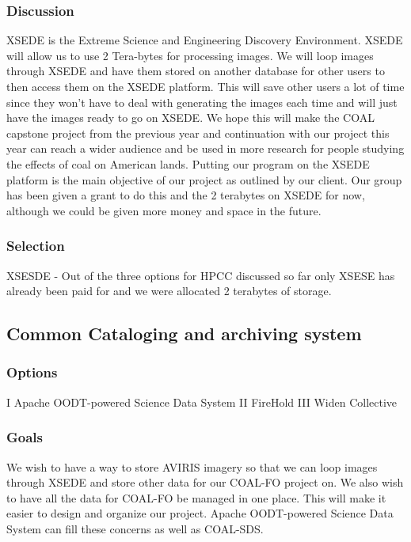 \documentclass[10pt,draftclsnofoot,onecolumn,journal,compsoc]{IEEEtran}
\begin{document}
\subsubsection{Discussion}

\noindent XSEDE is the Extreme Science and Engineering Discovery Environment. XSEDE will allow us to use 2 Tera-bytes for processing images. We will loop images through XSEDE and have them stored on another database for other users to then access them on the XSEDE platform. This will save other users a lot of time since they won’t have to deal with generating the images each time and will just have the images ready to go on XSEDE. We hope this will make the COAL capstone project from the previous year and continuation with our project this year can reach a wider audience and be used in more research for people studying the effects of coal on American lands. Putting our program on the XSEDE platform is the main objective of our project as outlined by our client. Our group has been given a grant to do this and the 2 terabytes on XSEDE for now, although we could be given more money and space in the future.

\subsubsection{Selection}

\noindent XSESDE - Out of the three options for HPCC discussed so far only XSESE has already been paid for and we were allocated 2 terabytes of storage.

\subsection{Common Cataloging and archiving system}
\subsubsection{Options}
\noindent I Apache OODT-powered Science Data System \newline
\noindent II FireHold \newline
\noindent III Widen Collective

\subsubsection{Goals}
\noindent We wish to have a way to store AVIRIS imagery so that we can loop images through XSEDE and store other data for our COAL-FO project on. We also wish to have all the data for COAL-FO be managed in one place. This will make it easier to design and organize our project. Apache OODT-powered Science Data System can fill these concerns as well as COAL-SDS.
\end{document}
